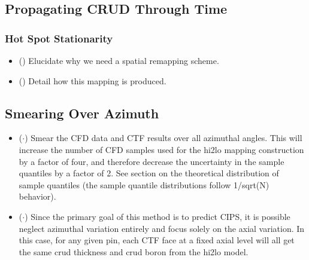 \subsection{Propagating CRUD Through Time}
\subsubsection{Hot Spot Stationarity}
\begin{itemize}
	\item (\checkmark) Elucidate why we need a spatial remapping scheme.
	\item (\checkmark) Detail how this mapping is produced.
\end{itemize}

\subsection{Smearing Over Azimuth}

\begin{itemize}
	\item ($\cdot$) Smear the CFD data and CTF results over all azimuthal angles.  This will increase the number of CFD samples used for the hi2lo mapping construction by a factor of four, and therefore decrease the uncertainty in the sample quantiles by a factor of 2.  See section on the theoretical distribution of sample quantiles (the sample quantile distributions follow 1/sqrt(N) behavior).
	\item ($\cdot$) Since the primary goal of this method is to predict CIPS, it is possible neglect azimuthal variation entirely and focus solely on the axial variation.  In this case, for any given pin, each CTF face at a fixed axial level will all get the same crud thickness and crud boron from the hi2lo model.
\end{itemize}
